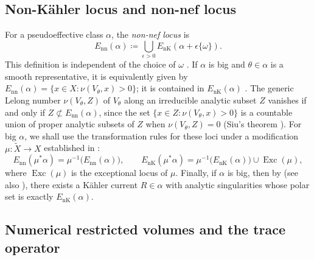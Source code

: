 \subsection{Non-K\"ahler locus and non-nef locus}\label{nk:sec:nK}

For a pseudoeffective class $\alpha$, the \emph{non-nef locus} is
\[
  {E_{\mathrm{nn}}}(\alpha)\coloneqq \bigcup_{\epsilon>0}{E_{\mathrm{nK}}}(\alpha+\epsilon\{\omega\}).
\]
This definition is independent of the choice of $\omega$
\cite[Section~2]{CT22Restricted}. If $\alpha$ is big and $\theta\in\alpha$ is a
smooth representative, it is equivalently given by
${E_{\mathrm{nn}}}(\alpha)=\{x\in X:\nu(V_\theta,x)>0\}$; it is contained in
${E_{\mathrm{nK}}}(\alpha)$ \cite[Definitions~1.7.6 and~1.7.7]{SGPT}. The generic
Lelong number $\nu(V_\theta,Z)$ of $V_\theta$ along an irreducible
analytic subset $Z$ vanishes if and only if $Z\not\subset{E_{\mathrm{nn}}}(\alpha)$,
since the set $\{x\in Z:\nu(V_\theta,x)>0\}$ is a countable union of
proper analytic subsets of $Z$ when $\nu(V_\theta,Z)=0$ (Siu's
theorem \cite{Siu74}). For big $\alpha$, we shall use the transformation rules for these loci under a
modification $\mu\colon\widetilde X\to X$ established in
\cite[Lemmas~4.1 and~4.3]{CT22Restricted}:
\begin{equation}\label{nk:eq:transformation-rules}
  {E_{\mathrm{nn}}}(\mu^*\alpha)=\mu^{-1}\bigl({E_{\mathrm{nn}}}(\alpha)\bigr),\qquad
  {E_{\mathrm{nK}}}(\mu^*\alpha)=\mu^{-1}\bigl({E_{\mathrm{nK}}}(\alpha)\bigr)\cup\operatorname{Exc}(\mu),
\end{equation}
where $\operatorname{Exc}(\mu)$ is the exceptional locus of $\mu$. Finally, if $\alpha$ is big, then by
\cite[Theorem~3.17]{Bou04Zariski} (see also \cite[Theorem~1.7.1]{SGPT}), there
exists a K\"ahler current $R\in\alpha$ with analytic singularities whose
polar set is exactly ${E_{\mathrm{nK}}}(\alpha)$.

\subsection{Numerical restricted volumes and the trace
operator}\label{nk:sec:restricted-volumes}

